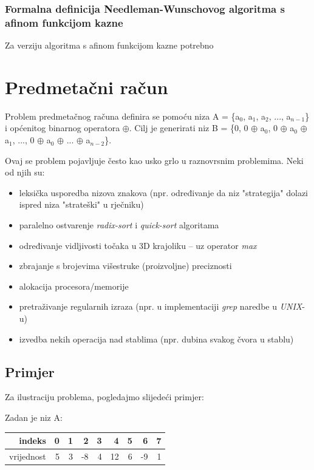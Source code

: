 \documentclass[times, utf8, zavrsni]{fer}
\begin{document}
\subsection{Formalna definicija Needleman-Wunschovog algoritma s afinom funkcijom kazne}

\indent

Za verziju algoritma s afinom funkcijom kazne potrebno

\chapter{Predmetačni račun}

Problem predmetačnog računa definira se pomoću niza A = \{a$_{0}$, a$_{1}$, a$_{2}$, ..., a$_{n-1}$\} i općenitog binarnog operatora $\oplus$. Cilj je generirati niz B = \{0, 0 $\oplus$ a$_{0}$, 0 $\oplus$ a$_{0}$ $\oplus$ a$_{1}$, ..., 0 $\oplus$ a$_{0}$ $\oplus$ ... $\oplus$ a$_{n-2}$\}.

Ovaj se problem pojavljuje često kao usko grlo u raznovrsnim problemima. Neki od njih su:
\begin{itemize}
\item leksička usporedba nizova znakova (npr. određivanje da niz "strategija" dolazi ispred niza "strateški" u rječniku)
\item paralelno ostvarenje \textit{radix-sort} i \textit{quick-sort} algoritama
\item određivanje vidljivosti točaka u 3D krajoliku – uz operator \textit{max}
\item zbrajanje s brojevima višestruke (proizvoljne) preciznosti
\item alokacija procesora/memorije
\item pretraživanje regularnih izraza (npr. u implementaciji \textit{grep} naredbe u \textit{UNIX}-u)
\item izvedba nekih operacija nad stablima (npr. dubina svakog čvora u stablu)
\end{itemize}

\section{Primjer}

Za ilustraciju problema, pogledajmo slijedeći primjer:

Zadan je niz A:
\begin{center}
\begin{tabular}{| r | r | r | r | r | r | r | r | r |}
\hline
indeks & 0 & 1 & 2 & 3 & 4 & 5 & 6 & 7 \\
\hline
vrijednost & 5 & 3 & -8 & 4 & 12 & 6 & -9 & 1\\
\hline
\end{tabular}
\end{center}
\end{document}

